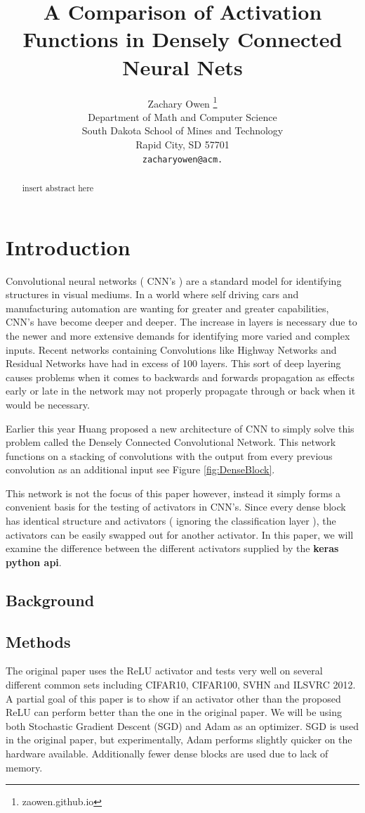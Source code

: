 \documentclass{article}
\title{A Comparison of Activation Functions in Densely Connected Neural Nets}
\author{
  Zachary Owen
  \thanks{ zaowen.github.io } \\
  Department of Math and Computer Science\\
  South Dakota School of Mines and Technology\\ 
  Rapid City, SD 57701 \\
  \texttt{zacharyowen@acm.} \\
}
\begin{document}

\maketitle

\begin{abstract}
        insert abstract here
\end{abstract}

\section{Introduction}

Convolutional neural networks ( CNN's ) are a standard model for identifying structures in visual mediums.
In a world where self driving cars and manufacturing automation are wanting for greater and greater capabilities, CNN's have become deeper and deeper.
The increase in layers is necessary due to the newer and more extensive demands for identifying more varied and complex inputs.
Recent networks containing Convolutions like Highway Networks and Residual Networks have had in excess of 100 layers.
This sort of deep layering causes problems when it comes to backwards and forwards propagation as effects early or late in the network may not properly propagate through or back when it would be necessary.

Earlier this year Huang proposed a new architecture of CNN to simply solve this problem called the Densely Connected Convolutional Network.
This network functions on a stacking of convolutions with the output from every previous convolution as an additional input see Figure \ref{fig:DenseBlock}.

This network is not the focus of this paper however, instead it simply forms a convenient basis for the testing of activators in CNN's.
Since every dense block has identical structure and activators ( ignoring the classification layer ), the activators can be easily swapped out for another activator.
In this paper, we will examine the difference between the different activators supplied by the \textbf{keras python api}.

\subsection{Background}

\subsection{Methods}
The original paper uses the ReLU activator and tests very well on several different common sets including CIFAR10, CIFAR100, SVHN and ILSVRC 2012.
A partial goal of this paper is to show if an activator other than the proposed ReLU can perform better than the one in the original paper.
We will be using both Stochastic Gradient Descent (SGD) and Adam as an optimizer. SGD is used in the original paper, but experimentally, Adam performs slightly quicker on the hardware available.
Additionally fewer dense blocks are used due to lack of memory.
\end{document}
